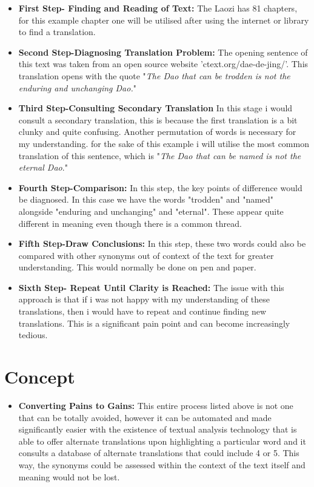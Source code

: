 \documentclass{article}
\begin{document}
\begin{itemize}

\item{\textbf{First Step- Finding and Reading of Text:} The Laozi has 81 chapters, for this example chapter one will be utilised after using the internet or library to find a translation.}
\item{\textbf{Second Step-Diagnosing Translation Problem:} The opening sentence of this text was taken from an open source website 'ctext.org/dae-de-jing/'. This translation opens with the quote "\textit{The Dao that can be trodden is not the enduring and unchanging Dao.}"}

\item{\textbf{Third Step-Consulting Secondary Translation} In this stage i would consult a secondary translation, this is because the first translation is a bit clunky and quite confusing. Another permutation of words is necessary for my understanding. for the sake of this example i will utilise the most common translation of this sentence, which is "\textit{The Dao that can be named is not the eternal Dao}."}
\item{\textbf{Fourth Step-Comparison:} In this step, the key points of difference would be diagnosed. In this case we have the words "trodden" and "named" alongside "enduring and unchanging" and "eternal". These appear quite different in meaning even though there is a common thread.}
\item{\textbf{Fifth Step-Draw Conclusions:} In this step, these two words could also be compared with other synonyms out of context of the text for greater understanding. This would normally be done on pen and paper.}
\item{\textbf{Sixth Step- Repeat Until Clarity is Reached:} The issue with this approach is that if i was not happy with my understanding of these translations, then i would have to repeat and continue finding new translations. This is a significant pain point and can become increasingly tedious.}


\end{itemize}

\section{Concept}

\begin{itemize}

\item{\textbf{Converting Pains to Gains:} This entire process listed above is not one that can be totally avoided, however it can be automated and made significantly easier with the existence of textual analysis technology that is able to offer alternate translations upon highlighting a particular word and it consults a database of alternate translations that could include 4 or 5. This way, the synonyms could be assessed within the context of the text itself and meaning would not be lost.}

\end{itemize}
\end{document}
